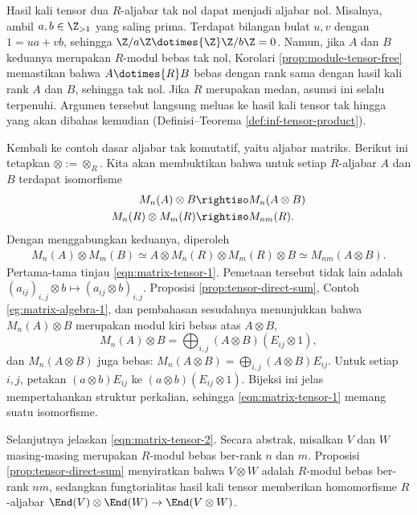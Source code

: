 \begin{remark}\label{rem:algebra-otimes-zero}
	Hasil kali tensor dua $R$-aljabar tak nol dapat menjadi aljabar nol. Misalnya, ambil $a, b \in \Z_{>1}$ yang saling prima. Terdapat bilangan bulat $u,v$ dengan $1 = ua+vb$, sehingga $\Z/a\Z \dotimes{\Z} \Z/b\Z = 0$. Namun, jika $A$ dan $B$ keduanya merupakan $R$-modul bebas tak nol, Korolari \ref{prop:module-tensor-free} memastikan bahwa $A \dotimes{R} B$ bebas dengan rank sama dengan hasil kali rank $A$ dan $B$, sehingga tak nol. Jika $R$ merupakan medan, asumsi ini selalu terpenuhi. Argumen tersebut langsung meluas ke hasil kali tensor tak hingga yang akan dibahas kemudian (Definisi--Teorema \ref{def:inf-tensor-product}).
\end{remark}

\begin{example}
	Kembali ke contoh dasar aljabar tak komutatif, yaitu aljabar matriks. Berikut ini tetapkan $\otimes := \otimes_R$. Kita akan membuktikan bahwa untuk setiap $R$-aljabar $A$ dan $B$ terdapat isomorfisme
	\begin{align}
		M_n(A) \otimes B & \rightiso M_n(A \otimes B) \label{eqn:matrix-tensor-1} \\
		M_n(R) \otimes M_m(R) & \rightiso M_{nm}(R). \label{eqn:matrix-tensor-2}
	\end{align}
	Dengan menggabungkan keduanya, diperoleh
	\begin{gather}\label{eqn:matrix-tensor-3}
		M_n(A) \otimes M_m(B) \simeq A \otimes M_n(R) \otimes M_m(R) \otimes B \simeq M_{nm}(A \otimes B).
	\end{gather}
	Pertama-tama tinjau \eqref{eqn:matrix-tensor-1}. Pemetaan tersebut tidak lain adalah $(a_{ij})_{i,j} \otimes b \mapsto (a_{ij} \otimes b)_{i,j}$. Proposisi \ref{prop:tensor-direct-sum}, Contoh \ref{eg:matrix-algebra-1}, dan pembahasan sesudahnya menunjukkan bahwa $M_n(A) \otimes B$ merupakan modul kiri bebas atas $A \otimes B$,
	\[ M_n(A) \otimes B = \bigoplus_{i,j} (A \otimes B) (E_{ij} \otimes 1), \]
	dan $M_n(A \otimes B)$ juga bebas: $M_n(A \otimes B) = \bigoplus_{i,j} (A \otimes B) E_{ij}$. Untuk setiap $i,j$, petakan $(a \otimes b) E_{ij}$ ke $(a \otimes b) (E_{ij} \otimes 1)$. Bijeksi ini jelas mempertahankan struktur perkalian, sehingga \eqref{eqn:matrix-tensor-1} memang suatu isomorfisme.
		
	Selanjutnya jelaskan \eqref{eqn:matrix-tensor-2}. Secara abstrak, misalkan $V$ dan $W$ masing-masing merupakan $R$-modul bebas ber-rank $n$ dan $m$. Proposisi \ref{prop:tensor-direct-sum} menyiratkan bahwa $V \otimes W$ adalah $R$-modul bebas ber-rank $nm$, sedangkan fungtorialitas hasil kali tensor memberikan homomorfisme $R$-aljabar $\End(V) \otimes \End(W) \to \End(V \otimes W)$.
	

\end{example}
